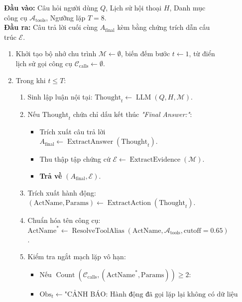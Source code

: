 \documentclass[a4paper,11pt]{article}
\begin{document}
\begin{figure}[htbp]
\centering
\begin{tcolorbox}[
    colback=codebg, colframe=brandblue, width=\textwidth,
    title={\small\bfseries\color{white} THUẬT TOÁN 1: VÒNG LẶP SUY LUẬN VÀ HÀNH ĐỘNG TỰ HÀNH REACT AGENT (AUTONOMOUS REACT LOOP)},
    fonttitle=\bfseries
]
\small
\textbf{Đầu vào:} Câu hỏi người dùng $Q$, Lịch sử hội thoại $H$, Danh mục công cụ $\mathcal{A}_{\text{tools}}$, Ngưỡng lặp $T = 8$.\\
\textbf{Đầu ra:} Câu trả lời cuối cùng $A_{\text{final}}$ kèm bằng chứng trích dẫn cấu trúc $\mathcal{E}$.
\begin{enumerate}[noitemsep,topsep=2pt]
    \item Khởi tạo bộ nhớ chu trình $\mathcal{M} \leftarrow \emptyset$, biến đếm bước $t \leftarrow 1$, từ điển lịch sử gọi công cụ $\mathcal{C}_{\text{calls}} \leftarrow \emptyset$.
    \item Trong khi $t \le T$:
    \begin{enumerate}[noitemsep]
        \item Sinh lập luận nội tại: $\text{Thought}_t \leftarrow \operatorname{LLM}(Q, H, \mathcal{M})$.
        \item Nếu $\text{Thought}_t$ chứa chỉ dấu kết thúc \textit{"Final Answer:"}:
        \begin{itemize}[noitemsep]
            \item Trích xuất câu trả lời $A_{\text{final}} \leftarrow \operatorname{ExtractAnswer}(\text{Thought}_t)$.
            \item Thu thập tập chứng cứ $\mathcal{E} \leftarrow \operatorname{ExtractEvidence}(\mathcal{M})$.
            \item \textbf{Trả về} $(A_{\text{final}}, \mathcal{E})$.
        \end{itemize}
        \item Trích xuất hành động: $(\text{ActName}, \text{Params}) \leftarrow \operatorname{ExtractAction}(\text{Thought}_t)$.
        \item Chuẩn hóa tên công cụ: $\text{ActName}^* \leftarrow \operatorname{ResolveToolAlias}(\text{ActName}, \mathcal{A}_{\text{tools}}, \text{cutoff}=0.65)$.
        \item Kiểm tra ngắt mạch lặp vô hạn:
        \begin{itemize}[noitemsep]
            \item Nếu $\operatorname{Count}(\mathcal{C}_{\text{calls}}, (\text{ActName}^*, \text{Params})) \ge 2$:
            \item $\text{Obs}_t \leftarrow \text{"CẢNH BÁO: Hành động đã gọi lặp lại không có dữ liệu mới. Hãy đổi công cụ hoặc kết luận insufficient\_evidence."}$

\end{itemize}
\end{enumerate}
\end{enumerate}
\end{tcolorbox}
\end{figure}
\end{document}
